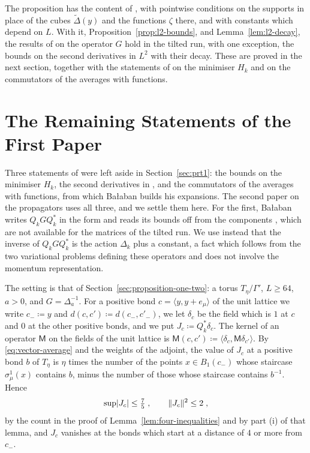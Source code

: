 \documentclass[11pt]{preprint}
\DeclarePairedDelimiter{\abs}{\lvert}{\rvert}
\DeclarePairedDelimiter{\norm}{\lVert}{\rVert}
\numberwithin{equation}{section}
\theoremstyle{definition}
\theoremstyle{remark}
\theoremstyle{plain}
\begin{document}
The proposition has the content of \cite[(1.110)--(1.113)]{BalabanPRT1}, with pointwise conditions on the supports in place of the cubes $\tilde\Delta(y)$ and the functions $\zeta$ there, and with constants which depend on $L$. With it, Proposition~\ref{prop:l2-bounds}, and Lemma~\ref{lem:l2-decay}, the results of \cite{BalabanPRT1} on the operator $G$ hold in the tilted run, with one exception, the bounds \cite[(1.114)]{BalabanPRT1} on the second derivatives in $L^2$ with their decay. These are proved in the next section, together with the statements of \cite{BalabanPRT1} on the minimiser $H_k$ and on the commutators of the averages with functions.

\section{The Remaining Statements of the First Paper}\label{sec:prt1-rest}

Three statements of \cite{BalabanPRT1} were left aside in Section~\ref{sec:prt1}: the bounds on the minimiser $H_k$, the second derivatives in \cite[(1.114)]{BalabanPRT1}, and the commutators of the averages with functions, from which Ba{\l}aban builds his expansions. The second paper on the propagators uses all three, and we settle them here. For the first, Ba{\l}aban writes $Q_kGQ_k^*$ in the form \cite[(1.99)]{BalabanPRT1} and reads its bounds off from the components \cite[(1.101)]{BalabanPRT1}, which are not available for the matrices of the tilted run. We use instead that the inverse of $Q_kGQ_k^*$ is the action $\Delta_k$ plus a constant, a fact which follows from the two variational problems defining these operators and does not involve the momentum representation.

The setting is that of Section~\ref{sec:proposition-one-two}: a torus $T_\eta/\Gamma'$, $L \geq 64$, $a > 0$, and $G = \Delta_a^{-1}$. For a positive bond $c = \langle y, y + e_\mu\rangle$ of the unit lattice we write $c_- \coloneqq y$ and $d(c, c') \coloneqq d(c_-, c'_-)$, we let $\delta_c$ be the field which is $1$ at $c$ and $0$ at the other positive bonds, and we put $J_c \coloneqq Q_k^*\delta_c$. The kernel of an operator $\mathsf M$ on the fields of the unit lattice is $\mathsf M(c, c') \coloneqq \langle\delta_c, \mathsf M\delta_{c'}\rangle$. By \eqref{eq:vector-average} and the weights of the adjoint, the value of $J_c$ at a positive bond $b$ of $T_\eta$ is $\eta$ times the number of the points $x \in B_1(c_-)$ whose staircase $\sigma^1_\mu(x)$ contains $b$, minus the number of those whose staircase contains $b^{-1}$. Hence
\begin{equation}\label{eq:source-of-bond}
    \sup\abs{J_c} \leq \tfrac75\;,
    \qquad
    \norm{J_c}^2 \leq 2\;,
\end{equation}
by the count in the proof of Lemma~\ref{lem:four-inequalities} and by part (i) of that lemma, and $J_c$ vanishes at the bonds which start at a distance of $4$ or more from $c_-$.
\end{document}
